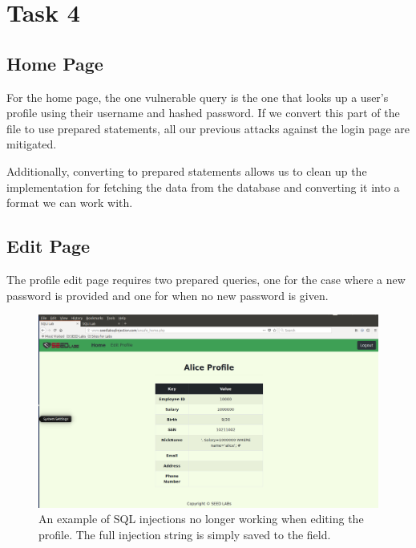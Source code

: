 \documentclass[12pt,letterpaper]{article}
\begin{document}
	\section*{Task 4}
		\subsection*{Home Page}
			For the home page, the one vulnerable query is the one that looks up a user's profile using their username and hashed password. If we convert this part of the file to use prepared statements, all our previous attacks against the login page are mitigated.
			
			Additionally, converting to prepared statements allows us to clean up the implementation for fetching the data from the database and converting it into a format we can work with.
			
			
		
		\subsection*{Edit Page}
			The profile edit page requires two prepared queries, one for the case where a new password is provided and one for when no new password is given.
			
			
			
			\begin{figure}[h!]
				\includegraphics[width=\linewidth]{task-4-example}
				\caption{An example of SQL injections no longer working when editing the profile. The full injection string is simply saved to the field.}
			\end{figure}
		
\end{document}
